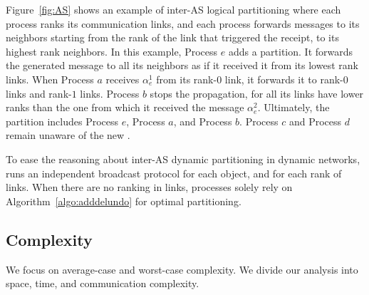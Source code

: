 Figure~\ref{fig:AS} shows an example of inter-AS logical partitioning
where each process ranks its communication links, and each process
forwards messages to its neighbors starting from the rank of the link
that triggered the receipt, to its highest rank neighbors. In this
example, Process $e$ adds a partition. It forwards the generated
message to all its neighbors as if it received it from its lowest rank
links. When Process $a$ receives $\alpha_e^1$ from its rank-$0$ link,
it forwards it to rank-$0$ links and rank-$1$ links.  Process $b$
stops the propagation, for all its links have lower ranks than the one
from which it received the message $\alpha_e^2$. Ultimately, the
partition includes Process $e$, Process $a$, and Process $b$. Process
$c$ and Process $d$ remain unaware of the new .

To ease the reasoning about inter-AS dynamic partitioning in dynamic
networks, \NAME runs an independent broadcast protocol for each
object, and for each rank of links.  
     When there
are no ranking in links, processes solely rely on
Algorithm~\ref{algo:adddelundo} for optimal partitioning.



\subsection{Complexity}
\label{subsec:complexity}


We focus on average-case and worst-case complexity. We divide our
analysis into space, time, and communication complexity.

